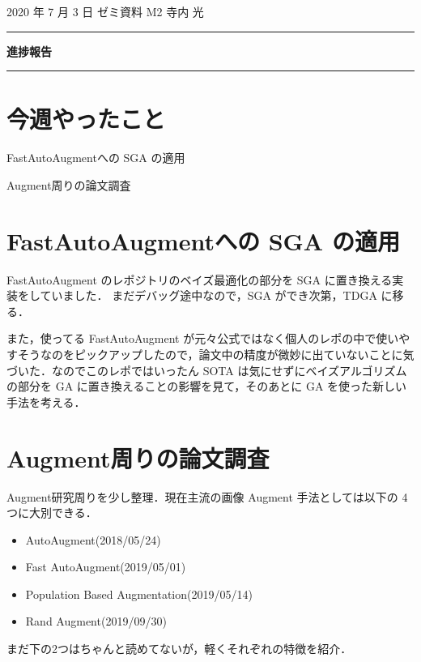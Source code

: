 \documentclass[onecolumn]{ujarticle}   %
\begin{document}
	\noindent

	\hspace{1em}
	2020 年 7 月 3 日
	ゼミ資料
	\hfill
	M2 寺内 光

	\vspace{2mm}

	\hrule

	\begin{center}
		{\Large \bf 進捗報告}
	\end{center}

	\hrule
	\vspace{3mm}

	\section{今週やったこと}
	\begin{itemize}{
		\item{FastAutoAugmentへの SGA の適用}
		\item{Augment周りの論文調査}
	}\end{itemize}
	\section{FastAutoAugmentへの SGA の適用}
	FastAutoAugment のレポジトリのベイズ最適化の部分を SGA に置き換える実装をしていました．
	まだデバッグ途中なので，SGA ができ次第，TDGA に移る．

	また，使ってる FastAutoAugment が元々公式ではなく個人のレポの中で使いやすそうなのをピックアップしたので，論文中の精度が微妙に出ていないことに気づいた．なのでこのレポではいったん SOTA は気にせずにベイズアルゴリズムの部分を GA に置き換えることの影響を見て，そのあとに GA を使った新しい手法を考える．

	\section{Augment周りの論文調査}
	Augment研究周りを少し整理．現在主流の画像 Augment 手法としては以下の 4 つに大別できる．
	\begin{itemize}
		\item{AutoAugment(2018/05/24)}
		\item{Fast AutoAugment(2019/05/01)}
		\item{Population Based Augmentation(2019/05/14)}
		\item{Rand Augment(2019/09/30)}
	\end{itemize}
	まだ下の2つはちゃんと読めてないが，軽くそれぞれの特徴を紹介．
\end{document}
